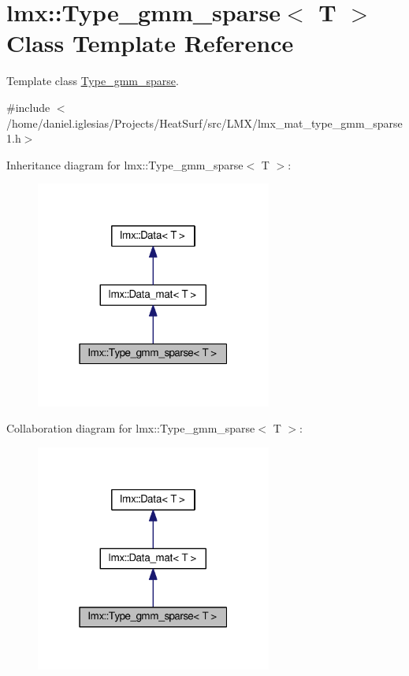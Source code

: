 \hypertarget{classlmx_1_1Type__gmm__sparse}{\section{lmx\-:\-:Type\-\_\-gmm\-\_\-sparse$<$ T $>$ Class Template Reference}
\label{classlmx_1_1Type__gmm__sparse}
}


Template class \hyperlink{classlmx_1_1Type__gmm__sparse}{Type\-\_\-gmm\-\_\-sparse}.  




{\ttfamily \#include $<$/home/daniel.\-iglesias/\-Projects/\-Heat\-Surf/src/\-L\-M\-X/lmx\-\_\-mat\-\_\-type\-\_\-gmm\-\_\-sparse1.\-h$>$}



Inheritance diagram for lmx\-:\-:Type\-\_\-gmm\-\_\-sparse$<$ T $>$\-:
\nopagebreak
\begin{figure}[H]
\begin{center}
\leavevmode
\includegraphics[width=220pt]{classlmx_1_1Type__gmm__sparse__inherit__graph}
\end{center}
\end{figure}


Collaboration diagram for lmx\-:\-:Type\-\_\-gmm\-\_\-sparse$<$ T $>$\-:
\nopagebreak
\begin{figure}[H]
\begin{center}
\leavevmode
\includegraphics[width=220pt]{classlmx_1_1Type__gmm__sparse__coll__graph}
\end{center}
\end{figure}
